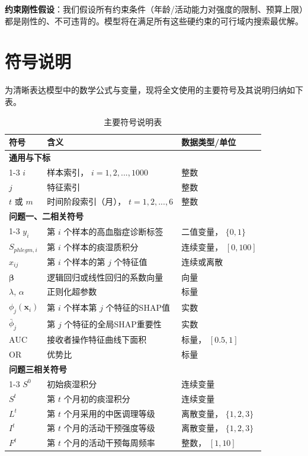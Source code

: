 \documentclass[12pt,a4paper]{ctexart}
\begin{document}
\textbf{约束刚性假设}：我们假设所有约束条件（年龄/活动能力对强度的限制、预算上限）都是刚性的、不可违背的。模型将在满足所有这些硬约束的可行域内搜索最优解。

\section{符号说明}
为清晰表达模型中的数学公式与变量，现将全文使用的主要符号及其说明归纳如下表。
\newpage
\begin{table}[h]
\centering
\caption{主要符号说明表}
\begin{tabular}{p{2.5cm}p{7.5cm}p{4cm}}
\toprule
\textbf{符号} & \textbf{含义} & \textbf{数据类型/单位} \\
\midrule
\multicolumn{3}{l}{\textbf{通用与下标}} \\
\cmidrule(lr){1-3}
$i$ & 样本索引， $i = 1, 2, ..., 1000$ & 整数 \\
$j$ & 特征索引 & 整数 \\
$t$ 或 $m$ & 时间阶段索引（月）， $t = 1, 2, ..., 6$ & 整数 \\
\midrule
\multicolumn{3}{l}{\textbf{问题一、二相关符号}} \\
\cmidrule(lr){1-3}
$y_i$ & 第 $i$ 个样本的高血脂症诊断标签 & 二值变量， $\{0, 1\}$ \\
$S_{phlegm,i}$ & 第 $i$ 个样本的痰湿质积分 & 连续变量， $[0, 100]$ \\
$x_{ij}$ & 第 $i$ 个样本的第 $j$ 个特征值 & 连续或离散 \\
$\bm{\beta}$ & 逻辑回归或线性回归的系数向量 & 向量 \\
$\lambda$, $\alpha$ & 正则化超参数 & 标量 \\
$\phi_j(\mathbf{x}_i)$ & 第 $i$ 个样本第 $j$ 个特征的SHAP值 & 实数 \\
$\bar{\phi}_j$ & 第 $j$ 个特征的全局SHAP重要性 & 实数 \\
$\text{AUC}$ & 接收者操作特征曲线下面积 & 标量， $[0.5, 1]$ \\
$\text{OR}$ & 优势比 & 标量 \\
\midrule
\multicolumn{3}{l}{\textbf{问题三相关符号}} \\
\cmidrule(lr){1-3}
$S^0$ & 初始痰湿积分 & 连续变量 \\
$S^t$ & 第 $t$ 个月初的痰湿积分 & 连续变量 \\
$L^t$ & 第 $t$ 个月采用的中医调理等级 & 离散变量， $\{1,2,3\}$ \\
$I^t$ & 第 $t$ 个月的活动干预强度等级 & 离散变量， $\{1,2,3\}$ \\
$F^t$ & 第 $t$ 个月的活动干预每周频率 & 整数， $[1, 10]$ \\

\end{tabular}
\end{table}
\end{document}
